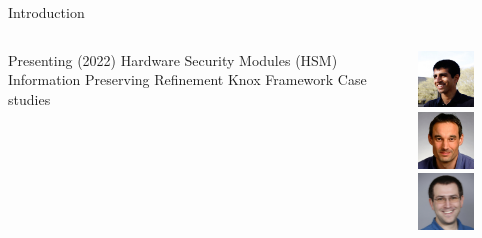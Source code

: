 \placelogofalse
\begin{frame}{Introduction}
\begin{columns}
\centering
\begin{outline}
  \1 Presenting \cite{Athalye2022Verifying} (2022)
  \1 Hardware Security Modules (HSM)
  \1 Information Preserving Refinement
  \1 Knox Framework 
  \1 Case studies
\end{outline}

\begin{center}
\centering
{}

\includegraphics[width=1.5cm]{author_athalye.jpg} 
\includegraphics[width=1.5cm]{author_kaashoek.jpg} 
\includegraphics[width=1.5cm]{author_zeldovich.jpg} 

\end{center}
\end{columns}
\end{frame}
\placelogotrue


